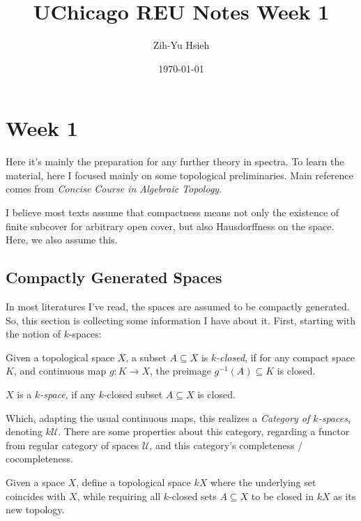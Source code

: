\documentclass{article}
\title{UChicago REU Notes Week 1}
\author{Zih-Yu Hsieh}
\date{\today}
\begin{document}
\maketitle
\tableofcontents

\section{Week 1}
Here it's mainly the preparation for any further theory in spectra. To learn the material, here I focused mainly on some topological preliminaries. Main reference comes from \emph{Concise Course in Algebraic Topology}.

\begin{rem} %
I believe most texts assume that compactness means not only the existence of finite subcover for arbitrary open cover, but also Hausdorffness on the space. Here, we also assume this.
\end{rem}

\subsection{Compactly Generated Spaces}

In most literatures I've read, the spaces are assumed to be compactly generated. So, this section is collecting some information I have about it. First, starting with the notion of $k$-spaces:

\begin{defn}
    Given a topological space $X$, a subset $A \subseteq X$ is \emph{$k$-closed}, if for any compact space $K$, and continuous map $g:K\rightarrow X$, the preimage $g^{-1}(A) \subseteq K$ is closed.

    $X$ is a \emph{$k$-space}, if any $k$-closed subset $A \subseteq X$ is closed.
\end{defn}

Which, adapting the usual continuous maps, this realizes a \emph{Category of $k$-spaces}, denoting $k\mathcal{U}$. There are some properties about this category, regarding a functor from regular category of spaces $\mathcal{U}$, and this category's completeness / cocompleteness.

\begin{defn}
    Given a space $X$, define a topological space $kX$ where the underlying set coincides with $X$, while requiring all $k$-closed sets $A \subseteq X$ to be closed in $kX$ as its new topology.
\end{defn}
\end{document}
